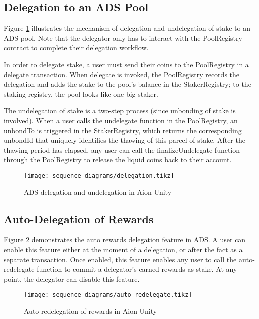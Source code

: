 \subsection{Delegation to an ADS Pool}

Figure \ref{fig:delegation} illustrates the mechanism of delegation and undelegation of stake to an ADS pool. Note that the delegator only has to interact with the PoolRegistry contract to complete their delegation workflow. 

In order to delegate stake, a user must send their coins to the PoolRegistry in a delegate transaction. When delegate is invoked, the PoolRegistry records the delegation and adds the stake to the pool's balance in the StakerRegistry; to the staking registry, the pool looks like one big staker. 

The undelegation of stake is a two-step process (since unbonding of stake is involved). When a user calls the undelegate function in the PoolRegistry, an unbondTo is triggered in the StakerRegistry, which returns the corresponding unbondId that uniquely identifies the thawing of this parcel of stake. After the thawing period has elapsed, any user can call the finalizeUndelegate function through the PoolRegistry to release the liquid coins back to their account. 

\begin{figure}[ht]
\centering
\texttt{[image: sequence-diagrams/delegation.tikz]}
\caption{ADS delegation and undelegation in Aion-Unity}
\label{fig:delegation}
\end{figure}
\clearpage

\subsection{Auto-Delegation of Rewards}

Figure \ref{fig:redelegation} demonstrates the  auto rewards delegation feature in ADS. A user can enable this feature either at the moment of a delegation, or after the fact as a separate transaction. Once enabled, this feature enables any user to call the auto-redelegate function to commit a delegator's earned rewards as stake. At any point, the delegator can disable this feature. 

\begin{figure}[ht]
\centering
\texttt{[image: sequence-diagrams/auto-redelegate.tikz]}
\caption{Auto redelegation of rewards in Aion Unity}
\label{fig:redelegation}
\end{figure}
\clearpage

